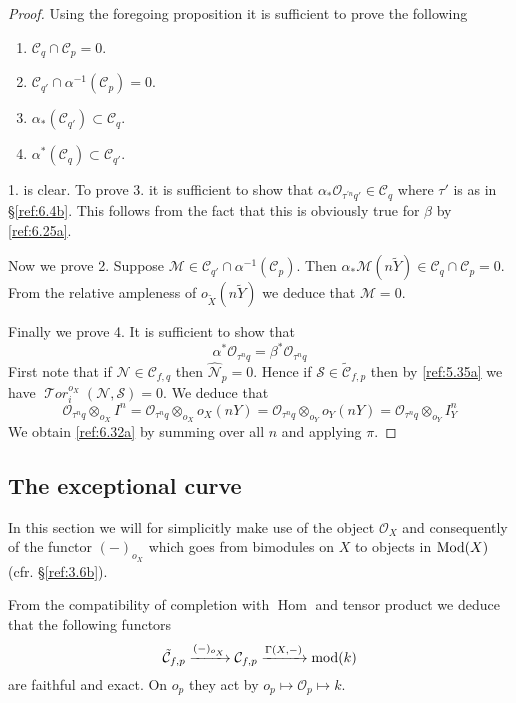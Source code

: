 \documentclass{amsproc}
\def\Cscr{{\mathcal C}}
\def\Mscr{{\mathcal M}}
\def\Nscr{{\mathcal N}}
\def\Oscr{{\mathcal O}}
\def\Sscr{{\mathcal S}}
\def\Tscr{{\mathcal T}}
\def\HTor{\operatorname {\Tscr \mathit{or}}}
\def\Mod{\mathop{\text{Mod}}}
\def\mod{\mathop{\text{mod}}}
\def\Hom{\operatorname {Hom}}
\def\HTor{\operatorname {\Tscr \mathit{or}}}
\let\oldtext\text
\def\text#1{\oldtext{\upshape #1}}
\theoremstyle{definition}
\theoremstyle{remark}
\numberwithin{equation}{section}
\numberwithin{table}{section}
\numberwithin{figure}{section}
\begin{document}
\begin{proof} 
Using the foregoing proposition it is sufficient to prove the
following
\begin{enumerate}
\item $\Cscr_q\cap \Cscr_p=0$.
\item $\Cscr_{q'}\cap \alpha^{-1}(\Cscr_p)=0$.
\item $\alpha_\ast(\Cscr_{q'})\subset \Cscr_q$.
\item $\alpha^\ast(\Cscr_q)\subset \Cscr_{q'}$.
\end{enumerate}
1. is clear. To prove 3. it is sufficient to show that $\alpha_\ast
\Oscr_{\tau^{\prime n}q'}\in \Cscr_q$ where $\tau'$ is as in 
\S\ref{ref:6.4b}. This
follows from the fact that this is obviously true for $\beta$ by
\eqref{ref:6.25a}.

Now we prove 2. Suppose $\Mscr\in 
\Cscr_{q'}\cap \alpha^{-1}(\Cscr_p)$. Then $\alpha_\ast\Mscr(n{\tilde{Y}})\in
\Cscr_q\cap \Cscr_p=0$. From the relative ampleness of $o_{\tilde{X}}(n{\tilde{Y}})$ we
deduce that $\Mscr=0$.

Finally we prove 4. It is sufficient to show that
\begin{equation}
\label{ref:6.32a}
\alpha^\ast
\Oscr_{\tau^n q}=\beta^\ast \Oscr_{\tau^n q}
\end{equation}
First note that if $\Nscr\in\Cscr_{f,q}$ then $\hat{\Nscr}_p=0$. Hence
if $\Sscr\in\tilde{\Cscr}_{f,p}$ then by \eqref{ref:5.35a} we have
$\HTor_i^{o_X}(\Nscr,\Sscr)=0$. We deduce that 
\[
\Oscr_{\tau^n q}\otimes_{o_X}{I^n}=\Oscr_{\tau^n q}\otimes_{o_X}o_X(nY)=
\Oscr_{\tau^n q}\otimes_{o_Y}o_Y(nY)=\Oscr_{\tau^n q}\otimes_{o_Y}I^n_{Y}
\]
We obtain \eqref{ref:6.32a} by summing over all $n$ and applying $\pi$.
\end{proof}



\subsection{The exceptional curve}
\label{ref:6.6b}
In this section we will for simplicitly make use of the object
$\Oscr_X$ and consequently of the functor $(-)_{o_X}$ which goes from
bimodules on $X$ to objects in $\Mod(X)$ (cfr. \S\ref{ref:3.6b}).

From the compatibility of completion with $\Hom$ and tensor product we
deduce that the following functors
\[
\tilde{\Cscr}_{f,p} \xrightarrow{(-)_{o_X}} \Cscr_{f,p} \xrightarrow
{\Gamma(X,-)} \mod(k)
\]
are faithful and exact. On $o_p$ they act by 
$
o_p\mapsto \Oscr_p\mapsto k
$.
\end{document}
